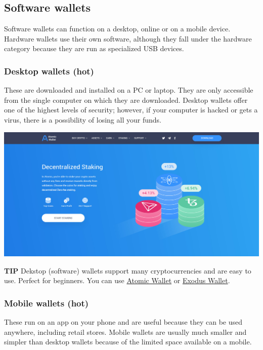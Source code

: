 \subsection{Software wallets}
Software wallets can function on a desktop, online or on a mobile device.  Hardware wallets use their own software, although they fall under the hardware category because they are run as specialized USB devices.

\subsubsection{Desktop wallets (hot)} 
These are downloaded and installed on a PC or laptop. They are only accessible from the single computer on which they are downloaded. Desktop wallets offer one of the highest levels of security; however, if your computer is hacked or gets a virus, there is  a possibility  of losing all your funds.

\bigskip

\begin{borderbox}
    \centering
    \includegraphics[width=\textwidth]{img/ch-wallets/atomic_wallet1.jpg}
\end{borderbox}
\medskip

\begin{tipbox}{\textbf{TIP}}
 Dekstop (software) wallets support many cryptocurrencies and are easy to use. Perfect for beginners.
\tcblower 
You can use \href{https://atomicwallet.io/}{Atomic Wallet} or \href{https://www.exodus.io/}{Exodus Wallet}.
\end{tipbox}\medskip

\subsubsection{Mobile wallets (hot)} 
These run on an app on your phone and are useful because they can be used anywhere, including retail stores. Mobile wallets are usually much smaller and simpler than desktop wallets because of the limited space available on a mobile.\medskip

